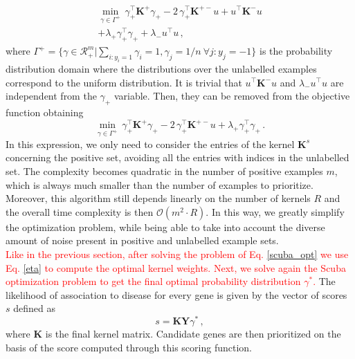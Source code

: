 \begin{multline*}
	\min \limits_{\gamma \in \Gamma^{+}} \, \gamma_{+}^{\top} \textbf{K}^{+} \gamma_{+} - 2 \,\gamma_{+}^{\top} \textbf{K}^{+-} u +  u^{\top} \textbf{K}^{-} u \\+ \lambda_{+} \gamma_{+}^{\top} \gamma_{+} + \lambda_{-} u^{\top}u \, ,
\end{multline*}
where $ \Gamma^{+} = \lbrace \gamma \in \mathcal{R}_+^m | \sum_{i:y_i=1} \gamma_i = 1, \gamma_j = 1/n \ \forall j : y_j = -1 \rbrace$ is the probability distribution domain where the distributions over the unlabelled examples correspond to the uniform distribution. It is trivial that $u^{\top} \textbf{K}^{-} u$ and $\lambda_{-} u^{\top}u$ are independent from the $\gamma_{+}$ variable. Then, they can be removed from the objective function obtaining
\begin{equation}\label{scuba_opt}
	\min \limits_{\gamma \in \Gamma^{+}} \, \gamma_{+}^{\top} \textbf{K}^{+} \gamma_{+} - 2 \, \gamma_{+}^{\top} \textbf{K}^{+-} u + \lambda_{+} \gamma_{+}^{\top} \gamma_{+} \, .
\end{equation}
In this expression, we only need to consider the entries of the kernel $\textbf{K}^{s}$ concerning the positive set, avoiding all the entries with indices in the unlabelled set. The complexity becomes quadratic in the number of positive examples $m$, which is always much smaller than the number of examples to prioritize. Moreover, this algorithm still depends linearly on the number of kernels $R$ and the overall time complexity is then $\mathcal{O}(m^2 \cdot R)$. In this way, we greatly simplify the optimization problem, while being able to take into account the diverse amount of noise present in positive and unlabelled example sets.\\
\textcolor{red}{Like in the previous section, after solving the problem of Eq. \ref{scuba_opt} we use Eq. \ref{eta} to compute the optimal kernel weights. Next, we solve again the Scuba optimization problem to get the final optimal probability distribution $\gamma^{*}$.} The likelihood of association to disease for every gene is given by the vector of scores $s$ defined as
\begin{equation}\label{score_function}
	s = \textbf{K} \textbf{Y} \gamma^{*} \, ,
\end{equation}
where $\textbf{K}$ is the final kernel matrix. Candidate genes are then prioritized on the basis of the score computed through this scoring function.

